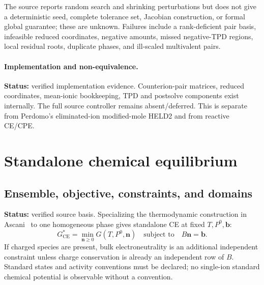 \documentclass[11pt]{article}
\newcommand{\Evidence}[1]{\textsf{#1}}
\newcommand{\Status}[1]{\textbf{Status:} \Evidence{#1}.}
\begin{document}
The source reports random search and shrinking perturbations but does not give
a deterministic seed, complete tolerance set, Jacobian construction, or formal
global guarantee; these are \Evidence{unknown}. Failures include a
rank-deficient pair basis, infeasible reduced coordinates, negative amounts,
missed negative-TPD regions, local residual roots, duplicate phases, and
ill-scaled multivalent pairs.

\paragraph{Implementation and non-equivalence.}
\Status{verified implementation evidence}
Counterion-pair matrices, reduced coordinates, mean-ionic bookkeeping, TPD and
postsolve components exist internally. The full source controller remains
absent/deferred. This is separate from Perdomo's eliminated-ion modified-mole
HELD2 and from reactive CE/CPE.

\section{Standalone chemical equilibrium}
\label{sec:eqform:ce}

\subsection{Ensemble, objective, constraints, and domains}

\Status{verified source basis}
Specializing the thermodynamic construction in Ascani~\cite{Ascani2023} to one
homogeneous phase gives standalone CE at fixed \(T,P^0,\boldsymbol b\):
\begin{equation}
 G_{\mathrm{CE}}^{*}
 =\min_{\boldsymbol n\geq0}
 G(T,P^0,\boldsymbol n)
 \quad\text{subject to}\quad
 B\boldsymbol n=\boldsymbol b.
\label{eq:eqform:ce-objective}
\end{equation}
If charged species are present, bulk electroneutrality is an additional
independent constraint unless charge conservation is already an independent
row of \(B\). Standard states and activity conventions must be declared; no
single-ion standard chemical potential is observable without a convention.
\end{document}
